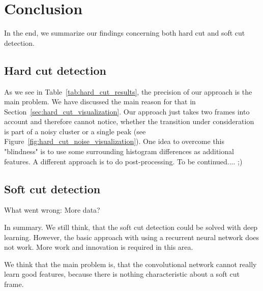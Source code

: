 \section{Conclusion}
\label{sec:conclusion}
In the end, we summarize our findings concerning both hard cut and soft cut detection.

\subsection{Hard cut detection}
\label{sec:conclusion_hard_cut}

As we see in Table~\ref{tab:hard_cut_results}, the precision of our approach is the main problem. 
We have discussed the main reason for that in Section~\ref{sec:hard_cut_visualization}.
Our approach just takes two frames into account and therefore cannot notice, whether the transition under consideration is part of a noisy cluster or a single peak (see Figure~\ref{fig:hard_cut_noise_visualization}).
One idea to overcome this "blindness" is to use some surrounding histogram differences as additional features.
A different approach is to do post-processing.
To be continued.... ;)

\subsection{Soft cut detection}
\label{sec:conclusion_hard_cut}

What went wrong:
More data?

In summary.
We still think, that the soft cut detection could be solved with deep learning.
However, the basic approach with using a recurrent neural network does not work.
More work and innovation is required in this area.

We think that the main problem is, that the convolutional network cannot really learn good features, because there is nothing characteristic about a soft cut frame.
